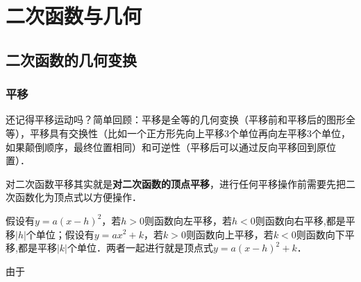 \section{二次函数与几何}



\subsection{二次函数的几何变换}

\subsubsection*{平移}
还记得平移运动吗？简单回顾：平移是全等的几何变换（平移前和平移后的图形全等），平移具有交换性（比如一个正方形先向上平移3个单位再向左平移3个单位，如果颠倒顺序，最终位置相同）和可逆性（平移后可以通过反向平移回到原位置）．
\par
对二次函数平移其实就是\textbf{对二次函数的顶点平移}，进行任何平移操作前需要先把二次函数化为顶点式以方便操作．
\par
假设有\(y=a(x-h)^2\)，若\(h>0\)则函数向左平移，若\(h<0\)则函数向右平移,都是平移\(|h|\)个单位；假设有\(y=ax^2+k\)，若\(k>0\)则函数向上平移，若\(k<0\)则函数向下平移,都是平移\(|k|\)个单位．两者一起进行就是顶点式\(y=a(x-h)^2+k\)．
\par
由于

